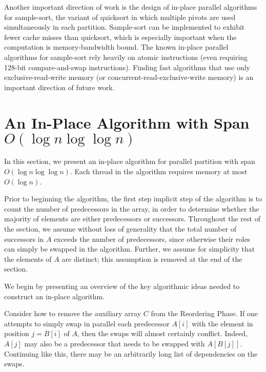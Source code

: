 \documentclass[twoside,leqno,twocolumn]{article}
\renewcommand{\paragraph}[1]{\vspace{0.09in}\noindent{\bf \boldmath #1.}}
\begin{document}
Another important direction of work is the design of in-place parallel
algorithms for sample-sort, the variant of quicksort in which multiple
pivots are used simultaneously in each partition. Sample-sort can be
implemented to exhibit fewer cache misses than quicksort, which is
especially important when the computation is memory-bandwidth
bound. The known in-place parallel algorithms for sample-sort rely
heavily on atomic instructions \cite{AxtmannWi17} (even requiring
128-bit compare-and-swap instructions). Finding fast algorithms that
use only exclusive-read-write memory (or
concurrent-read-exclusive-write memory) is an important direction of
future work.




\clearpage
\appendix

\section{An In-Place Algorithm with Span $O(\log n \log \log n)$}\label{secalg}

In this section, we present an in-place algorithm for parallel
partition with span $O(\log n \log \log n)$. Each thread in the
algorithm requires memory at most $O(\log n)$.

Prior to beginning the algorithm, the first step implicit step of the
algorithm is to count the number of predecessors in the array, in
order to determine whether the majority of elements are either
predecessors or successors. Throughout the rest of the section, we
assume without loss of generality that the total number of successors
in $A$ exceeds the number of predecessors, since otherwise their roles
can simply be swapped in the algorithm. Further, we assume for
simplicity that the elements of $A$ are distinct; this assumption is
removed at the end of the section.


\paragraph{Algorithm Outline}
We begin by presenting an overview of the key algorithmic ideas needed
to construct an in-place algorithm.

Consider how to remove the auxiliary array $C$ from the Reordering
Phase. If one attempts to simply swap in parallel each predecessor
$A[i]$ with the element in position $j = B[i]$ of $A$, then the swaps
will almost certainly conflict. Indeed, $A[j]$ may also be a
predecessor that needs to be swapped with $A[B[j]]$. Continuing like
this, there may be an arbitrarily long list of dependencies on the
swaps.
\end{document}
